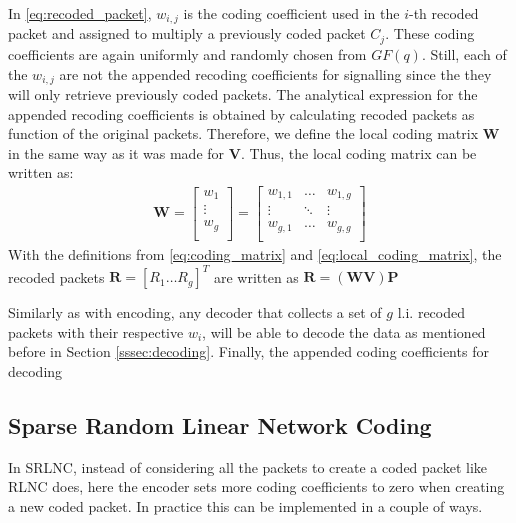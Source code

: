 In \eqref{eq:recoded_packet}, $w_{i,j}$ is the coding coefficient used
in the $i$-th recoded packet and assigned to multiply a previously coded
packet $C_j$. These coding coefficients are again uniformly and randomly chosen
from $GF(q)$. Still, each of the $w_{i,j}$ are not the appended recoding
coefficients for signalling since the they will only retrieve previously
coded packets. The analytical expression for the appended recoding
coefficients is obtained by calculating recoded packets as function of the
original packets. Therefore, we define the local coding matrix $\textbf{W}$
in the same way as it was made for $\textbf{V}$. Thus, the local coding matrix
can be written as:
%
\begin{align} \label{eq:local_coding_matrix}
\textbf{W} =
\left[
\begin{array}{c}
        w_1    \\ \hline
        \vdots \\ \hline
        w_g    \\
\end{array}
\right]
=
\left[
\begin{array}{ccc}
        w_{1,1} & \ldots & w_{1,g} \\
        \vdots  & \ddots & \vdots  \\
        w_{g,1} & \ldots & w_{g,g} \\
\end{array}
\right]
\end{align}
%
With the definitions from \eqref{eq:coding_matrix} and
\eqref{eq:local_coding_matrix}, the recoded packets
$\textbf{R} = \left[R_1 \ldots R_g \right]^T$ are written as
$\textbf{R} = (\textbf{W} \textbf{V}) \textbf{P}$



Similarly as with encoding, any decoder that collects a set
of $g$ \ac{l.i.} recoded packets with their respective $w_i$, will be able to
decode the data as mentioned before in Section \ref{sssec:decoding}. Finally,
the appended coding coefficients for decoding

\subsection{Sparse Random Linear Network Coding}

In \ac{SRLNC}, instead of considering all the packets to create a coded
packet like \ac{RLNC} does, here the encoder sets more coding coefficients to
zero when creating a new coded packet. In practice this can be implemented in
a couple of ways.

